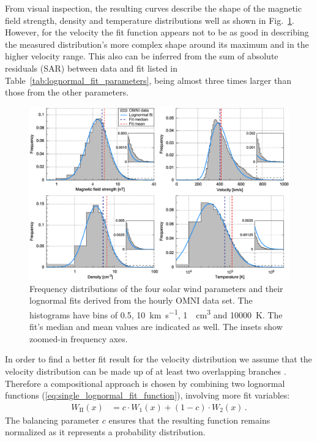 
From visual inspection, the resulting curves describe the shape of the magnetic field strength, density and temperature distributions well as shown in Fig.~\ref{fig:histogram_fits_4_a_zoom_paper_pdfplot}. However, for the velocity the fit function appears not to be as good in describing the measured distribution’s more complex shape around its maximum and in the higher velocity range. This also can be inferred from the sum of absolute residuals (SAR) between data and fit listed in Table~\ref{tab:lognormal_fit_parameters}, being almost three times larger than those from the other parameters.
\begin{figure}
	\includegraphics[width=18cm]{figures/histogram_fits_4_a_zoom_paper_pdfplot.pdf}
	\caption{Frequency distributions of the four solar wind parameters and their lognormal fits derived from the hourly OMNI data set. The histograms have bins of \SI{0.5}{\nT}, \SI{10}{\km\per\s}, \SI{1}{\per\cm\cubed} and \SI{10000}{\K}. The fit's median and mean values are indicated as well. The insets show zoomed-in frequency axes.}
	\label{fig:histogram_fits_4_a_zoom_paper_pdfplot}
\end{figure}

In order to find a better fit result for the velocity distribution we assume that the velocity distribution can be made up of at least two overlapping branches \citep{McGregor2011b}. Therefore a compositional approach  is chosen by combining two lognormal functions (\ref{eq:single_lognormal_fit_function}), involving more fit variables:
\begin{align}
	W_\text{II}(x) &= c \cdot W_1(x) + (1 -c) \cdot W_2(x)\,.	\label{eq:double_lognormal_fit_function}
\end{align}
The balancing parameter $c$ ensures that the resulting function remains normalized as it represents a probability distribution.

